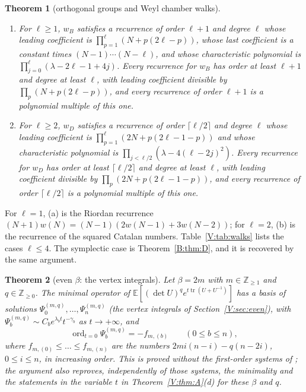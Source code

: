 \documentclass[11pt,a4paper]{article}
\newtheorem{theorem}{Theorem}[section]
\theoremstyle{definition}
\theoremstyle{remark}
\newcommand{\Z}{\mathbb Z}
\newcommand{\E}{\mathbb E}
\newcommand{\cl}[1]{\lceil #1\rceil}
\DeclareMathOperator{\ord}{ord}
\DeclareMathOperator{\tr}{tr}
\numberwithin{equation}{section}
\begin{document}
\begin{theorem}[orthogonal groups and Weyl chamber walks]\label{V:thm:D}
\begin{enumerate}
\item[(a)] For $\ell\ge1$, $w_B$ satisfies a recurrence of order $\ell+1$ and degree $\ell$ whose leading coefficient is $\prod_{p=1}^{\ell}(N+p(2\ell-p))$, whose last coefficient is a constant times $(N-1)\cdots(N-\ell)$, and whose characteristic polynomial is $\prod_{j=0}^{\ell}(\lambda-2\ell-1+4j)$. Every recurrence for $w_B$ has order at least $\ell+1$ and degree at least $\ell$, with leading coefficient divisible by $\prod_p(N+p(2\ell-p))$, and every recurrence of order $\ell+1$ is a polynomial multiple of this one.
\item[(b)] For $\ell\ge2$, $w_D$ satisfies a recurrence of order $\cl{\ell/2}$ and degree $\ell$ whose leading coefficient is $\prod_{p=1}^{\ell}(2N+p(2\ell-1-p))$ and whose characteristic polynomial is $\prod_{j<\ell/2}(\lambda-4(\ell-2j)^2)$. Every recurrence for $w_D$ has order at least $\cl{\ell/2}$ and degree at least $\ell$, with leading coefficient divisible by $\prod_p(2N+p(2\ell-1-p))$, and every recurrence of order $\cl{\ell/2}$ is a polynomial multiple of this one.
\end{enumerate}
\end{theorem}

For $\ell=1$, (a) is the Riordan recurrence $(N+1)w(N)=(N-1)(2w(N-1)+3w(N-2))$; for $\ell=2$, (b) is the recurrence of the squared Catalan numbers. Table~\ref{V:tab:walks} lists the cases $\ell\le4$. The symplectic case is Theorem~\ref{B:thm:D}, and it is recovered by the same argument.

\begin{theorem}[even $\beta$: the vertex integrals]\label{V:thm:E}
Let $\beta=2m$ with $m\in\Z_{\ge1}$ and $q\in\Z_{\ge0}$. The minimal operator of $\E[(\det U)^qe^{t\tr(U+U^{-1})}]$ has a basis of solutions $\Psi^{(m,q)}_0,\dots,\Psi^{(m,q)}_n$ (the vertex integrals of Section~\ref{V:sec:even}), with $\Psi^{(m,q)}_b\sim C_be^{\lambda_bt}t^{-\gamma_b}$ as $t\to+\infty$, and
\[
\ord_{t=0}\Psi^{(m,q)}_b=-f_{m,(b)}\qquad(0\le b\le n),
\]
where $f_{m,(0)}\le\dots\le f_{m,(n)}$ are the numbers $2mi(n-i)-q(n-2i)$, $0\le i\le n$, in increasing order. This is proved without the first-order systems of \cite{FK22,FW26}; the argument also reproves, independently of those systems, the minimality and the statements in the variable $t$ in Theorem~\ref{V:thm:A}(d) for these $\beta$ and $q$.
\end{theorem}
\end{document}
